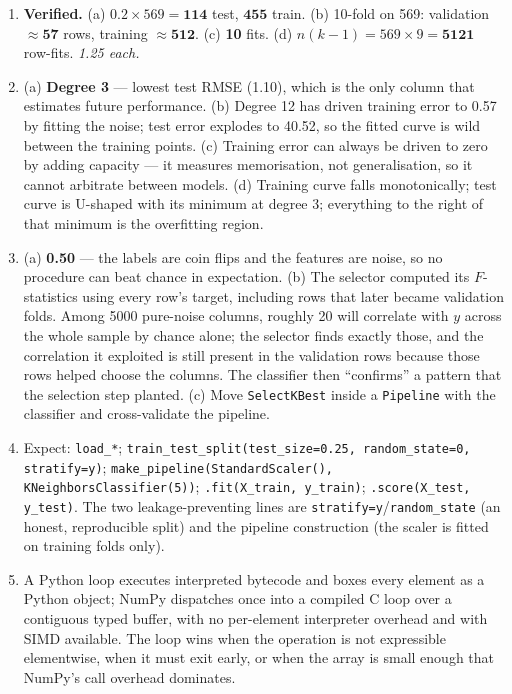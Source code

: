 \documentclass[11pt,a4paper]{article}
\newcommand{\A}[1]{\item[\textbf{#1}]}
\begin{document}
\begin{enumerate}[leftmargin=1.9cm]
\A{U1.16} \textbf{Verified.} (a) $0.2 \times 569 = \mathbf{114}$ test,
$\mathbf{455}$ train. (b) 10-fold on 569: validation $\approx \mathbf{57}$
rows, training $\approx \mathbf{512}$. (c) \textbf{10} fits. (d)
$n(k-1) = 569 \times 9 = \mathbf{5121}$ row-fits.
\emph{1.25 each.}

\A{U1.17} (a) \textbf{Degree 3} --- lowest test RMSE (1.10), which is the only
column that estimates future performance. (b) Degree 12 has driven training
error to 0.57 by fitting the noise; test error explodes to 40.52, so the fitted
curve is wild between the training points. (c) Training error can always be
driven to zero by adding capacity --- it measures memorisation, not
generalisation, so it cannot arbitrate between models. (d) Training curve falls
monotonically; test curve is U-shaped with its minimum at degree 3; everything
to the right of that minimum is the overfitting region.

\A{U1.18} (a) \textbf{0.50} --- the labels are coin flips and the features are
noise, so no procedure can beat chance in expectation. (b) The selector
computed its $F$-statistics using every row's target, including rows that later
became validation folds. Among 5000 pure-noise columns, roughly 20 will
correlate with $y$ across the whole sample by chance alone; the selector finds
exactly those, and the correlation it exploited is still present in the
validation rows because those rows helped choose the columns. The classifier
then ``confirms'' a pattern that the selection step planted. (c) Move
\texttt{SelectKBest} inside a \texttt{Pipeline} with the classifier and
cross-validate the pipeline.

\A{U1.19} Expect: \texttt{load\_*}; \texttt{train\_test\_split(test\_size=0.25,
random\_state=0, stratify=y)}; \texttt{make\_pipeline(StandardScaler(),
KNeighborsClassifier(5))}; \texttt{.fit(X\_train, y\_train)};
\texttt{.score(X\_test, y\_test)}. The two leakage-preventing lines are
\texttt{stratify=y}/\texttt{random\_state} (an honest, reproducible split) and
the pipeline construction (the scaler is fitted on training folds only).

\A{U1.20} A Python loop executes interpreted bytecode and boxes every element
as a Python object; NumPy dispatches once into a compiled C loop over a
contiguous typed buffer, with no per-element interpreter overhead and with SIMD
available. The loop wins when the operation is not expressible elementwise,
when it must exit early, or when the array is small enough that NumPy's
call overhead dominates.

\end{enumerate}
\end{document}
